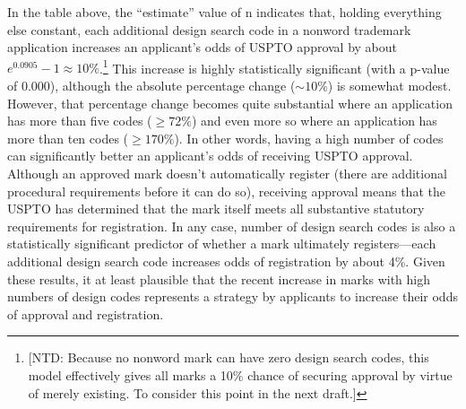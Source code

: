 \documentclass[letterpaper, 11pt, oneside]{article}
\begin{document}

\noindent In the table above, the ``estimate'' value of n indicates that, holding everything else constant, each additional design search code in a nonword trademark application increases an applicant's odds of USPTO approval by about $e^{0.0905}-1 \approx 10\%$.\footnote{[NTD: Because no nonword mark can have zero design search codes, this model effectively gives all marks a 10\% chance of securing approval by virtue of merely existing. To consider this point in the next draft.]} This increase is highly statistically significant (with a p-value of 0.000), although the absolute percentage change ($\sim10\%$) is somewhat modest. However, that percentage change becomes quite substantial where an application has more than five codes ($\ge 72\%$) and even more so where an application has more than ten codes ($\ge 170\%$). In other words, having a high number of codes can significantly better an applicant's odds of receiving USPTO approval. Although an approved mark doesn't automatically register (there are additional procedural requirements before it can do so), receiving approval means that the USPTO has determined that the mark itself meets all substantive statutory requirements for registration. In any case, number of design search codes is also a statistically significant predictor of whether a mark ultimately registers—each additional design search code increases odds of registration by about 4\%. Given these results, it at least plausible that the recent increase in marks with high numbers of design codes represents a strategy by applicants to increase their odds of approval and registration. 
\end{document}
